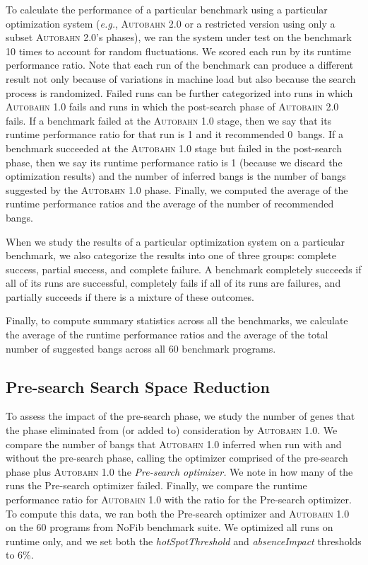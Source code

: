 \documentclass[format=sigplan, review=true, 9pt]{acmart}
\newcommand{\SHOWCOMMENT}[1]{\ifdraft #1 \fi}
\newcommand{\ksf}[1]{\SHOWCOMMENT{{\color{tuftsblue} [K: #1]}}}
\newcommand{\cut}[1]{}
\newcommand{\eg}{\textit{e.g.}}
\newcommand{\hotspotcost}[0]{\textit{hotSpotThreshold}}
\newcommand{\Ao}[0]{\textsc{Autobahn 1.0}}
\newcommand{\At}[0]{\textsc{Autobahn 2.0}}
\newcommand{\preopt}[0]{pre-search}
\newcommand{\postopt}[0]{post-search}
\newcommand{\Preopt}[0]{Pre-search}
\newcommand{\absim}[0]{\textit{absenceImpact}}
\begin{document}
To calculate the performance of a particular benchmark using a
particular optimization system (\eg{}, \At{} or a 
restricted version using only a subset \At's phases), we ran the system under test on the benchmark 10
times to account for random fluctuations.
We scored each run by its runtime performance 
ratio. Note that each run of the benchmark can produce a different
result not only because of variations in machine load but also
because the search process is randomized.  Failed runs can be further
categorized into runs in which \Ao{} fails and runs in which
the \postopt{} phase of \At{}
fails. If a benchmark failed at the \Ao{} stage, then we say that its
runtime performance ratio for that run is 1 and it recommended
0~bangs. If a benchmark succeeded at the \Ao{} stage but failed
in the \postopt{} phase, then we say its runtime performance ratio is
1 (because we discard the optimization results) and the
number of inferred bangs is the number of bangs suggested by the \Ao{}
phase.  Finally, we computed the \cut{\ksf{harmonic}}average of the runtime
performance ratios and the \cut{\ksf{arithmetic}}average of the number of
recommended bangs.    

When we study the results of a particular optimization system on a
particular benchmark, we also categorize the results into one of three
groups: complete success, partial success, and complete failure.  A
benchmark completely succeeds if all of its runs are successful,
completely fails if all of its runs are failures, and partially
succeeds if there is a mixture of these outcomes.

Finally, to compute summary statistics across all the benchmarks, 
we calculate the \cut{\ksf{harmonic} mean} average of the runtime performance ratios
and the \cut{\ksf{arithmetic} mean} average of the total number of suggested bangs
across all 60 benchmark programs. 


\subsection{\Preopt{} Search Space Reduction}

To assess the impact of the \preopt{} phase, we study the number of
genes that the phase eliminated from (or added to) consideration by \Ao{}.
We compare the number of bangs that \Ao{} inferred when run with and
without the \preopt{} phase, calling the optimizer comprised of
the \preopt{} phase plus \Ao{} the \textit{\Preopt{} optimizer. } We
note in how many of the runs the \Preopt{} optimizer failed.  Finally,
we compare the runtime performance ratio for \Ao{} with the ratio for
the \Preopt{} optimizer.
To compute this data, we ran both the \Preopt{} optimizer and \Ao{} on
the 60 programs from NoFib benchmark suite.  We optimized all runs 
on runtime only, and we set both the \hotspotcost{} and \absim{} thresholds 
to 6\%.
\end{document}
